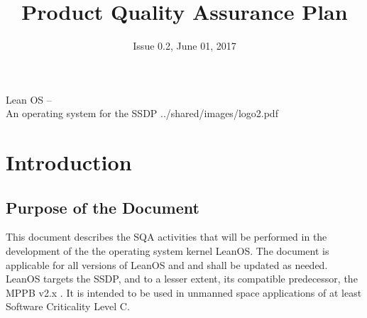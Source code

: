 

\title{Product Quality Assurance Plan}
\def \documentid {LEANOS-UVIE-PAQ-001}
\date{Issue 0.2, June 01, 2017}

\newcommand\affil[1]{\textsuperscript#1}

\def\preparedby {Armin Luntzer\affil{1}}
\def\checkedby {Roland Ottensamer\affil{1}}
\def\approvedby {Franz Kerschbaum\affil{1}}

\def\affiliations{
	\affil{1} Department of Astrophysics, University of Vienna
}








 
\usepackage{multicol}
\usepackage{enumitem}
\usepackage{vhistory}

\usepackage{biblatex}








\setmainfont{MyriadPro-SemiCondensed}
\uvietitlepage%
{Lean OS --\\ An operating system for the SSDP}%
{\doctitle}%
{../shared/images/logo2.pdf}
\setmainfont{MyriadPro}

\approvalpage

\tableofcontents
\newpage



\begin{versionhistory}
\end{versionhistory}


\chapter{Introduction}

\section{Purpose of the Document}


This document describes the \gls{SQA} activities that will be
performed in the development of the the operating system kernel LeanOS.
The document is applicable for all versions of LeanOS and and shall be updated
as needed.\\

\noindent
LeanOS targets the \gls{SSDP}, and to a lesser extent, its
compatible predecessor, the \gls{MPPB} v2.x \cite{MPPB}.
It is intended to be used in unmanned space applications of at least
Software Criticality Level C. \\

